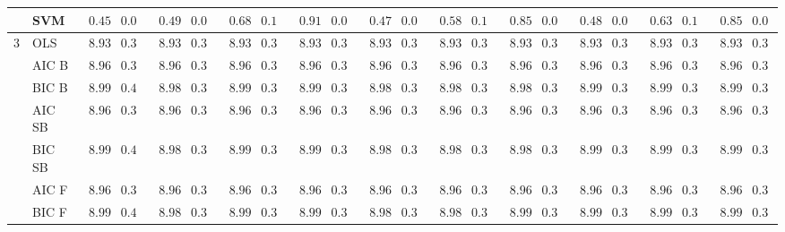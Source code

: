 \begin{tabular}{p{0.2cm}p{1cm}|p{0.6cm}p{0.6cm}|p{0.6cm}p{0.6cm}p{0.6cm}p{0.6cm}p{0.6cm}p{0.6cm}|p{0.6cm}p{0.6cm}p{0.6cm}p{0.6cm}p{0.6cm}p{0.6cm}|p{0.6cm}p{0.6cm}p{0.6cm}p{0.6cm}p{0.6cm}p{0.6cm}}
 & SVM  & $\phantom{0}0.45$ & $0.03$ & $\phantom{0}0.49$ & $0.04$ & $\phantom{0}0.68$ & $0.11$ & $\phantom{0}0.91$ & $0.05$ & $\phantom{0}0.47$ & $0.03$ & $\phantom{0}0.58$ & $0.10$ & $\phantom{0}0.85$ & $0.06$ & $\phantom{0}0.48$ & $0.03$ & $\phantom{0}0.63$ & $0.10$ & $\phantom{0}0.85$ & $0.06$ \\\hline
3 & OLS  & $\phantom{0}8.93$ & $0.39$ & $\phantom{0}8.93$ & $0.39$ & $\phantom{0}8.93$ & $0.39$ & $\phantom{0}8.93$ & $0.39$ & $\phantom{0}8.93$ & $0.39$ & $\phantom{0}8.93$ & $0.39$ & $\phantom{0}8.93$ & $0.39$ & $\phantom{0}8.93$ & $0.39$ & $\phantom{0}8.93$ & $0.39$ & $\phantom{0}8.93$ & $0.39$ \\
 & AIC B  & $\phantom{0}8.96$ & $0.39$ & $\phantom{0}8.96$ & $0.39$ & $\phantom{0}8.96$ & $0.39$ & $\phantom{0}8.96$ & $0.39$ & $\phantom{0}8.96$ & $0.39$ & $\phantom{0}8.96$ & $0.39$ & $\phantom{0}8.96$ & $0.39$ & $\phantom{0}8.96$ & $0.39$ & $\phantom{0}8.96$ & $0.39$ & $\phantom{0}8.96$ & $0.39$ \\
 & BIC B  & $\phantom{0}8.99$ & $0.40$ & $\phantom{0}8.98$ & $0.39$ & $\phantom{0}8.99$ & $0.39$ & $\phantom{0}8.99$ & $0.39$ & $\phantom{0}8.98$ & $0.39$ & $\phantom{0}8.98$ & $0.39$ & $\phantom{0}8.98$ & $0.39$ & $\phantom{0}8.99$ & $0.39$ & $\phantom{0}8.99$ & $0.39$ & $\phantom{0}8.99$ & $0.39$ \\
 & AIC SB  & $\phantom{0}8.96$ & $0.39$ & $\phantom{0}8.96$ & $0.39$ & $\phantom{0}8.96$ & $0.39$ & $\phantom{0}8.96$ & $0.39$ & $\phantom{0}8.96$ & $0.39$ & $\phantom{0}8.96$ & $0.39$ & $\phantom{0}8.96$ & $0.39$ & $\phantom{0}8.96$ & $0.39$ & $\phantom{0}8.96$ & $0.39$ & $\phantom{0}8.96$ & $0.39$ \\
 & BIC SB  & $\phantom{0}8.99$ & $0.40$ & $\phantom{0}8.98$ & $0.39$ & $\phantom{0}8.99$ & $0.39$ & $\phantom{0}8.99$ & $0.39$ & $\phantom{0}8.98$ & $0.39$ & $\phantom{0}8.98$ & $0.39$ & $\phantom{0}8.98$ & $0.39$ & $\phantom{0}8.99$ & $0.39$ & $\phantom{0}8.99$ & $0.39$ & $\phantom{0}8.99$ & $0.39$ \\
 & AIC F  & $\phantom{0}8.96$ & $0.39$ & $\phantom{0}8.96$ & $0.39$ & $\phantom{0}8.96$ & $0.39$ & $\phantom{0}8.96$ & $0.39$ & $\phantom{0}8.96$ & $0.39$ & $\phantom{0}8.96$ & $0.39$ & $\phantom{0}8.96$ & $0.39$ & $\phantom{0}8.96$ & $0.39$ & $\phantom{0}8.96$ & $0.39$ & $\phantom{0}8.96$ & $0.39$ \\
 & BIC F  & $\phantom{0}8.99$ & $0.40$ & $\phantom{0}8.98$ & $0.39$ & $\phantom{0}8.99$ & $0.39$ & $\phantom{0}8.99$ & $0.39$ & $\phantom{0}8.98$ & $0.39$ & $\phantom{0}8.98$ & $0.39$ & $\phantom{0}8.99$ & $0.39$ & $\phantom{0}8.99$ & $0.39$ & $\phantom{0}8.99$ & $0.39$ & $\phantom{0}8.99$ & $0.39$ \\

\end{tabular}
